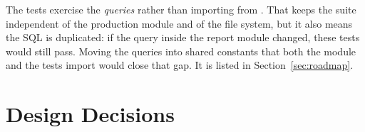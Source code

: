 \begin{warnbox}
The tests exercise the \emph{queries} rather than importing
 from . That keeps
the suite independent of the production module and of the file system, but
it also means the SQL is duplicated: if the query inside the report module
changed, these tests would still pass. Moving the queries into shared
constants that both the module and the tests import would close that gap.
It is listed in Section~\ref{sec:roadmap}.
\end{warnbox}

\section{Design Decisions}

